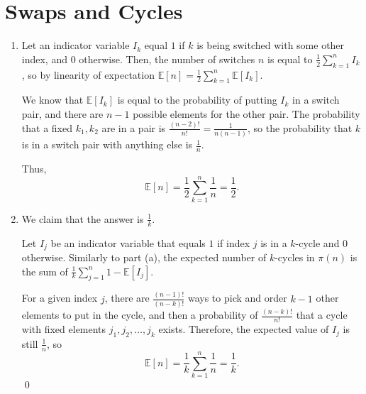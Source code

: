 \documentclass{article}
\begin{document}
\section{Swaps and Cycles}
\begin{enumerate}[label=(\alph*)]
	\item Let an indicator variable $I_k$ equal $1$ if $k$ is being switched with some other index, and $0$ otherwise. Then, the number of switches $n$ is equal to $\frac{1}{2} \sum_{k=1}^n I_k$, so by linearity of expectation $\mathbb{E}[n] = \frac{1}{2} \sum_{k=1}^n \mathbb{E}[I_k]$.

	We know that $\mathbb{E}[I_k]$ is equal to the probability of putting $I_k$ in a switch pair, and there are $n-1$ possible elements for the other pair. The probability that a fixed $k_1, k_2$ are in a pair is $\frac{(n-2)!}{n!} = \frac{1}{n(n-1)}$, so the probability that $k$ is in a switch pair with anything else is $\frac{1}{n}$. 

	Thus, \[\mathbb{E}[n] = \frac{1}{2} \sum_{k=1}^n \frac{1}{n} = \boxed{\frac{1}{2}}.\]
	\item We claim that the answer is $\boxed{\frac{1}{k}}$. 
	
	Let $I_j$ be an indicator variable that equals $1$ if index $j$ is in a $k$-cycle and $0$ otherwise. Similarly to part (a), the expected number of $k$-cycles in $\pi(n)$ is the sum of $\frac{1}{k} \sum_{j=1}^{n} 1-\mathbb{E}[I_j]$.

	For a given index $j$, there are $\frac{(n-1)!}{(n-k)!}$ ways to pick and order $k-1$ other elements to put in the cycle, and then a probability of $\frac{(n-k)!}{n!}$ that a cycle with fixed elements $j_1, j_2, \ldots, j_k$ exists. 
	Therefore, the expected value of $I_j$ is still $\frac{1}{n}$, so \[\mathbb{E}[n] = \frac{1}{k} \sum_{k=1}^n \frac{1}{n} = \frac{1}{k}.\] \qed

\end{enumerate}
\end{document}
